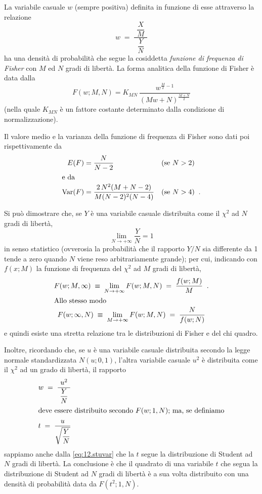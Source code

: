 La variabile casuale $w$ (sempre positiva) definita in
funzione di esse attraverso la relazione
\begin{equation*}
  w \; = \; \frac{\phantom{t} \dfrac{X}{M}
    \phantom{t}}{\dfrac{Y}{N}}
\end{equation*}
ha una densit\`a di probabilit\`a che segue la cosiddetta
\emph{funzione di frequenza di Fisher} con $M$ ed $N$ gradi
di libert\`a.  La forma analitica della funzione di Fisher
\`e data dalla
\begin{equation} \label{eq:12.fisher}
  F(w;M,N) = K_{MN} \, \frac{w^{\frac{M}{2} - 1}}{\left( M
    w + N \right)^{\frac{M + N}{2}}}
\end{equation}
(nella quale $K_{MN}$ \`e un fattore costante determinato
dalla condizione di normalizzazione).

Il valore medio e la varianza della funzione di frequenza di
Fisher sono dati poi rispettivamente da
\begin{align*}
  E(F) &= \frac{N}{N-2} &&\text{(se $N>2$)} \\
  \intertext{e da}
  \operatorname{Var}(F) &= \frac{2 \, N^2 (M + N - 2)}{M (N - 2)^2
    (N - 4)} &&\text{(se $N>4$)} \;\; .
\end{align*}

Si pu\`o dimostrare che, se $Y$ \`e una variabile casuale
distribuita come il $\chi^2$ ad $N$ gradi di libert\`a,
\begin{equation*}
  \lim_{N \to +\infty} \frac{Y}{N} = 1
\end{equation*}
in senso statistico (ovverosia la probabilit\`a che il
rapporto $Y/N$ sia differente da 1 tende a zero quando $N$
viene reso arbitrariamente grande); per cui, indicando con
$f(x;M)$ la funzione di frequenza del $\chi^2$ ad $M$ gradi
di libert\`a,
\begin{gather*}
  F(w; M, \infty) \; \equiv \; \lim_{N \to +\infty}
    F(w; M, N) \; = \; \frac{f(w; M)}{M} \;\; . \\
  \intertext{Allo stesso modo}
  F(w; \infty, N) \; \equiv \; \lim_{M \to +\infty}
    F(w; M, N) \; = \; \frac{N}{f(w;N)}
\end{gather*}
e quindi esiste una stretta relazione tra le distribuzioni
di Fisher e del chi quadro.

Inoltre, ricordando che, se $u$ \`e una variabile casuale
distribuita secondo la legge normale standardizzata
$N(u;0,1)$, l'altra variabile casuale $u^2$ \`e distribuita
come il $\chi^2$ ad un grado di libert\`a, il rapporto
\begin{gather*}
  w \; = \; \frac{\phantom{t} u^2
    \phantom{t}}{\dfrac{Y}{N}} \\
  \intertext{deve essere distribuito secondo
    $F(w;1,N)$; ma, se definiamo}
  t \; = \; \frac{\phantom{t} u
    \phantom{t}}{\sqrt{\dfrac{Y}{N}}}
\end{gather*}
sappiamo anche dalla \eqref{eq:12.stuvar} che la $t$ segue
la distribuzione di Student ad $N$ gradi di libert\`a.  La
conclusione \`e che il quadrato di una variabile $t$ che
segua la distribuzione di Student ad $N$ gradi di libert\`a
\`e a sua volta distribuito con una densit\`a di
probabilit\`a data da $F(t^2; 1, N)$.

